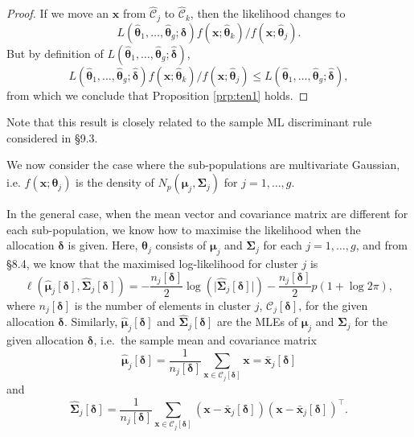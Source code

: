 \documentclass[]{book}
\theoremstyle{definition}
\theoremstyle{definition}
\theoremstyle{definition}
\theoremstyle{remark}
\begin{document}
\begin{proof}
{}If we move an \(\boldsymbol x\) from \(\hat{\mathcal{C}}_j\) to \(\hat{\mathcal{C}}_k\), then the likelihood changes to
\[
L(\hat{\boldsymbol \theta}_1, \ldots , \hat{\boldsymbol \theta}_g; \boldsymbol \delta)f(\boldsymbol x; \hat{\boldsymbol \theta}_k)/f(\boldsymbol x; \hat{\boldsymbol \theta}_j).
\]
But by definition of \(L(\hat{\boldsymbol \theta}_1, \ldots , \hat{\boldsymbol \theta}_g; \hat{\boldsymbol \delta})\),
\[
L(\hat{\boldsymbol \theta}_1, \ldots , \hat{\boldsymbol \theta}_g; \hat{\boldsymbol \delta})f(\boldsymbol x; \hat{\boldsymbol \theta}_k)/f(\boldsymbol x; \hat{\boldsymbol \theta}_j) \leq L(\hat{\boldsymbol \theta}_1, \ldots , \hat{\boldsymbol \theta}_g; \hat{\boldsymbol \delta}),
\]
from which we conclude that Proposition \ref{prp:ten1} holds.
\end{proof}

Note that this result is closely related to the sample ML discriminant rule considered in \S 9.3.

We now consider the case where the sub-populations are multivariate Gaussian, i.e. \(f(\boldsymbol x; \boldsymbol \theta_j)\) is the density of \(N_p(\boldsymbol \mu_j, \boldsymbol \Sigma_j)\) for \(j=1, \ldots , g\).

In the general case, when the mean vector and covariance matrix are different for each sub-population, we know how to maximise the likelihood when the allocation \(\boldsymbol \delta\) is given.
Here, \(\boldsymbol \theta_j\) consists of \(\boldsymbol \mu_j\) and \(\boldsymbol \Sigma_j\) for each \(j=1, \ldots , g\), and from \S 8.4, we know that the maximised log-likelihood for cluster \(j\) is
\[
\ell(\hat{\boldsymbol \mu}_j[\boldsymbol \delta], \hat{\boldsymbol \Sigma}_j[ \boldsymbol \delta])=-\frac{n_j[\boldsymbol \delta]}{2}\log (\vert \hat{\boldsymbol \Sigma}_j[\boldsymbol \delta]\vert)-\frac{n_j[\boldsymbol \delta]}{2}p(1+\log 2\pi),
\]
where \(n_j[\boldsymbol \delta]\) is the number of elements in cluster \(j\), \(\mathcal{C}_j[\boldsymbol \delta]\), for the given allocation \(\boldsymbol \delta\). Similarly, \(\hat{\boldsymbol \mu}_j[\boldsymbol \delta]\) and \(\hat{\boldsymbol \Sigma}_j[\boldsymbol \delta]\) are the MLEs of \(\boldsymbol \mu_j\) and \(\boldsymbol \Sigma_j\) for the given allocation \(\boldsymbol \delta\), i.e.~the sample mean and covariance matrix
\[
\hat{\boldsymbol \mu}_j[\boldsymbol \delta]=\frac{1}{n_j[\boldsymbol \delta]}\sum_{\boldsymbol x\in \mathcal{C}_j[\boldsymbol \delta]} \boldsymbol x=\bar{\boldsymbol x}_j[\boldsymbol \delta]
\]
and
\[
\hat{\boldsymbol \Sigma}_j[\boldsymbol \delta]=\frac{1}{n_j[\boldsymbol \delta]}\sum_{\boldsymbol x\in \mathcal{C}_j[\boldsymbol \delta]}(\boldsymbol x- \bar{\boldsymbol x}_j[\boldsymbol \delta])(\boldsymbol x- \bar{\boldsymbol x}_j[\boldsymbol \delta])^\top.
\]
\end{document}
